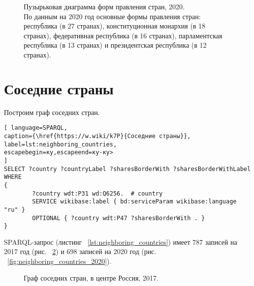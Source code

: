 \begin{figure}
	{
		\setlength{\fboxsep}{0pt}%
		\setlength{\fboxrule}{1pt}%
	}
	\caption{Пузырьковая диаграмма форм правления стран, 2020.
	\\
	По данным на 2020 год  основные формы правления стран: республика (в 27 странах), конституционная монархия (в 18 странах), федеративная республика (в 16 странах), парламентская республика (в 13 странах) и президентская республика (в 12 странах).
}%
	\label{fig:bubble_chart_forms_of_government_countries_2020}%
\end{figure}

\section{Соседние страны}

Построим граф соседних стран.


\begin{lstlisting}[ language=SPARQL, 
caption={\href{https://w.wiki/k7P}{Соседние страны}},
label=lst:neighboring_countries, 
escapebegin=ку,escapeend=ку-ку>
]
SELECT ?country ?countryLabel ?sharesBorderWith ?sharesBorderWithLabel
WHERE
{
		?country wdt:P31 wd:Q6256.	# country
		SERVICE wikibase:label { bd:serviceParam wikibase:language "ru" }
		OPTIONAL { ?country wdt:P47 ?sharesBorderWith . }
}
\end{lstlisting}

SPARQL-запрос (листинг ~\ref{lst:neighboring_countries}) имеет 787 записей на 2017 год (рис. ~\ref{fig:neighboring_countries_2017}) и 698 записей на 2020 год (рис. ~\ref{fig:neighboring_countries_2020}).

\begin{figure}
	{
		\setlength{\fboxsep}{0pt}%
		\setlength{\fboxrule}{1pt}%
	}
	\caption{Граф соседних стран, в центре Россия, 2017.
	}%
	\label{fig:neighboring_countries_2017}%
\end{figure}

